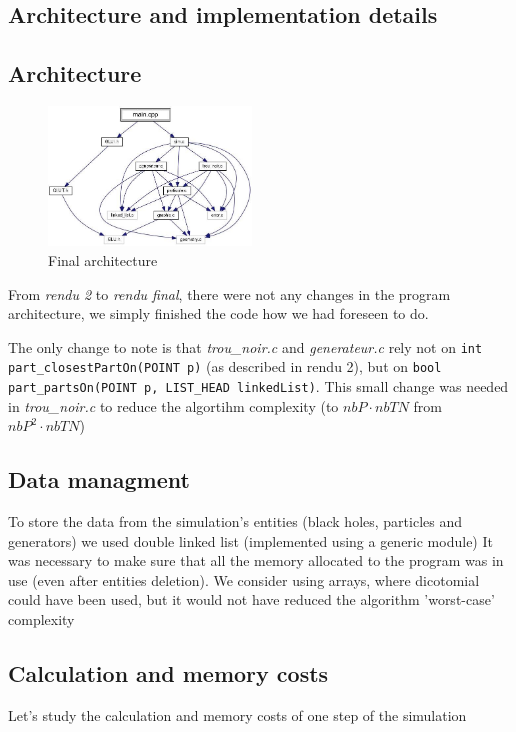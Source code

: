 \documentclass[a4paper]{article} %
\begin{document}
\begin{multicols*}{2}
\section{Architecture and implementation details}

\subsection{Architecture}
\begin{figure}[H]
\centering
\includegraphics[width=0.48\textwidth]{architecture.jpg}
\caption{Final architecture}
\end{figure}

From \emph{rendu 2} to \emph{rendu final}, there were not any changes in the
program architecture, we simply finished the code how we had foreseen to do.

The only change to note is that \emph{trou\_noir.c} and \emph{generateur.c} rely not on \texttt{int part\_closestPartOn(POINT p)}
(as described in rendu 2), but on \texttt{bool part\_partsOn(POINT p, LIST\_HEAD linkedList)}.
This small change was needed in \emph{trou\_noir.c} to reduce the algortihm complexity (to $nbP \cdot nbTN$ from $nbP^2 \cdot nbTN$)

\subsection{Data managment}
To store the data from the simulation's entities (black holes, particles and generators)
we used double linked list (implemented using a generic module)
It was necessary to make sure that all the memory allocated to the program was in use (even after entities deletion).
We consider using arrays, where dicotomial could have been used, but it would not have reduced the algorithm 'worst-case' complexity 

\subsection{Calculation and memory costs}
Let's study the calculation and memory costs of one step of the simulation



\end{multicols*}
\end{document}
